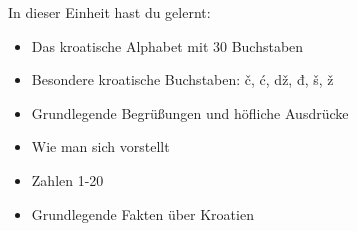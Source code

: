In dieser Einheit hast du gelernt:
\begin{itemize}
    \item Das kroatische Alphabet mit 30 Buchstaben
    \item Besondere kroatische Buchstaben: č, ć, dž, đ, š, ž
    \item Grundlegende Begrüßungen und höfliche Ausdrücke
    \item Wie man sich vorstellt
    \item Zahlen 1-20
    \item Grundlegende Fakten über Kroatien
\end{itemize}
